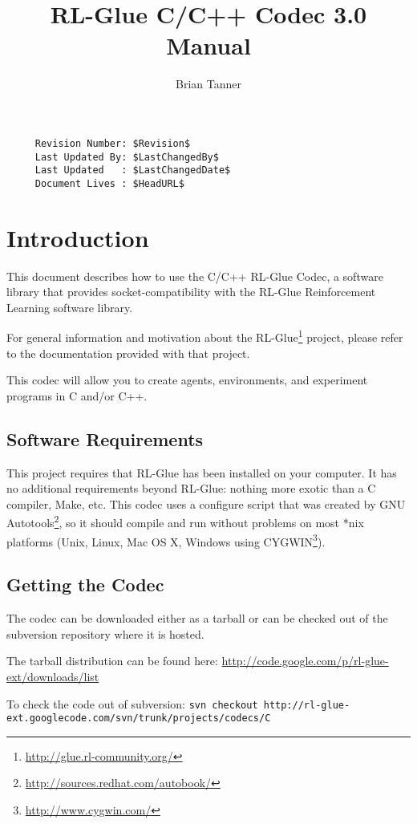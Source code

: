 \documentclass[11pt]{article}
\title{RL-Glue C/C++ Codec 3.0 Manual }
\author{Brian Tanner}
\date{}
\begin{document}
\maketitle
\tableofcontents

\begin{verbatim}
     Revision Number: $Revision$
     Last Updated By: $LastChangedBy$
     Last Updated   : $LastChangedDate$
     Document Lives : $HeadURL$
\end{verbatim}
\section{Introduction}

This document describes how to use the C/C++ RL-Glue Codec, a software library that provides socket-compatibility with the RL-Glue Reinforcement Learning software library.  

For general information and motivation about the RL-Glue\footnote{\url{http://glue.rl-community.org/}} project, please refer to the documentation provided with that project.

This codec will allow you to create agents, environments, and experiment programs in C and/or C++.

\subsection{Software Requirements}
This project requires that RL-Glue has been installed on your computer.  It has no additional requirements beyond RL-Glue: nothing more exotic than a C compiler, Make, etc.  This codec uses a configure script that was created by GNU Autotools\footnote{\url{http://sources.redhat.com/autobook/}}, so it should compile and run without problems on most *nix platforms (Unix, Linux, Mac OS X, Windows using CYGWIN\footnote{\url{http://www.cygwin.com/}}). 

\subsection{Getting the Codec}
The codec can be downloaded either as a tarball or can be checked out of the subversion repository where it is hosted.

The tarball distribution can be found here:\newline
\url{http://code.google.com/p/rl-glue-ext/downloads/list}


To check the code out of subversion:\newline
\texttt{svn checkout http://rl-glue-ext.googlecode.com/svn/trunk/projects/codecs/C}
\end{document}

